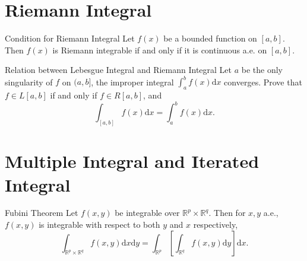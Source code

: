 \section{Riemann Integral}

\begin{theorem}{Condition for Riemann Integral}{}
  Let $f(x)$ be a bounded function on $[a, b]$.
  Then $f(x)$ is Riemann integrable if and only if
  it is continuous a.e. on $[a, b]$.
\end{theorem}

\begin{example}{Relation between Lebesgue Integral and Riemann Integral}{}
  Let $a$ be the only singularity of $f$ on $(a, b]$,
  the improper integral $\int_a^b f(x)\mathrm{d} x$ converges.
  Prove that $f \in L[a, b]$ if and only if $f \in R[a, b]$,
  and 
  \begin{equation}
    \int_{[a,b]} f(x)\mathrm{d} x = \int_a^b f(x)\mathrm{d} x.
  \end{equation}
\end{example}

\section{Multiple Integral and Iterated Integral}

\begin{theorem}{Fubini Theorem}{}
  Let $f(x, y)$ be integrable over $\mathbb{R}^p \times \mathbb{R}^q$. Then
  for $x, y$ a.e., $f(x,y)$ is integrable with respect to both $y$ and $x$
  respectively,
  \begin{equation}
    \int_{\mathbb{R}^p \times \mathbb{R}^q} f(x,y)\mathrm{d} x\mathrm{d}y 
    = \int_{\mathbb{R}^p} \left[ \int_{\mathbb{R}^q} f(x,y)\mathrm{d} y \right]\mathrm{d} x.
  \end{equation}
\end{theorem}


